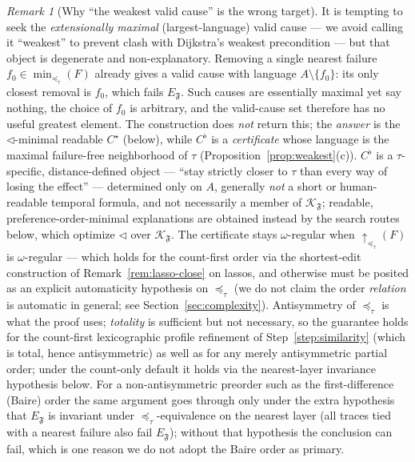 \documentclass[11pt]{article}
\theoremstyle{remark}
\newtheorem{remark}{Remark}
\newcommand{\Frame}{\mathfrak{F}}
\begin{document}
\begin{remark}[Why ``the weakest valid cause'' is the wrong target]
\label{rem:weakest-degenerate}
It is tempting to seek the \emph{extensionally maximal} (largest-language) valid
cause --- we avoid calling it ``weakest'' to prevent clash with Dijkstra's
weakest precondition --- but that object is degenerate and non-explanatory. Removing a single
nearest failure \(f_0\in\min_{\preceq_\tau}(F)\) already gives a valid cause with
language \(A\setminus\{f_0\}\): its only closest removal is \(f_0\), which fails
\(E_{\Frame}\). Such causes are essentially maximal yet say nothing, the choice of
\(f_0\) is arbitrary, and the valid-cause set therefore has no useful greatest
element. The construction does \emph{not} return this; the \emph{answer} is the
\(\triangleleft\)-minimal readable \(C^{\star}\) (below), while \(C^{\flat}\) is a
\emph{certificate} whose language is the maximal failure-free neighborhood of
\(\tau\) (Proposition~\ref{prop:weakest}(c)). \(C^{\flat}\) is a \(\tau\)-specific,
distance-defined object --- ``stay strictly closer to \(\tau\) than every way of
losing the effect'' --- determined only on \(A\), generally \emph{not} a short or
human-readable temporal formula, and not necessarily a member of
\(\mathcal{K}_{\Frame}\); readable, preference-order-minimal explanations are
obtained instead by the search routes below, which optimize \(\triangleleft\) over
\(\mathcal{K}_{\Frame}\). The certificate stays \(\omega\)-regular when
\(\uparrow_{\preceq_\tau}(F)\) is \(\omega\)-regular --- which holds for the
count-first order via the shortest-edit construction of
Remark~\ref{rem:lasso-close} on lassos, and otherwise must be posited as an
explicit automaticity hypothesis on \(\preceq_\tau\) (we do not claim the order
\emph{relation} is automatic in general; see Section~\ref{sec:complexity}). Antisymmetry of \(\preceq_\tau\) is what the proof uses;
\emph{totality} is sufficient but not necessary, so the guarantee holds for the
count-first lexicographic profile refinement of Step~\ref{step:similarity} (which is
total, hence antisymmetric) as well as for any merely antisymmetric partial
order; under the count-only default it holds via the nearest-layer invariance
hypothesis below. For a non-antisymmetric preorder such as the first-difference (Baire)
order the same argument goes
through only under the extra hypothesis that \(E_{\Frame}\) is invariant under
\(\preceq_\tau\)-equivalence on the nearest layer (all traces tied with a nearest
failure also fail \(E_{\Frame}\)); without that hypothesis the conclusion can
fail, which is one reason we do not adopt the Baire order as primary.
\end{remark}
\end{document}
